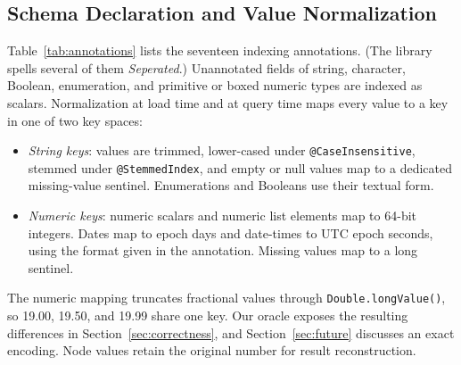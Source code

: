 \subsection{Schema Declaration and Value Normalization}
Table~\ref{tab:annotations} lists the seventeen indexing annotations. (The library spells several of them \emph{Seperated}.) Unannotated fields of string, character, Boolean, enumeration, and primitive or boxed numeric types are indexed as scalars. Normalization at load time and at query time maps every value to a key in one of two key spaces:
\begin{itemize}
\item \emph{String keys}: values are trimmed, lower-cased under \texttt{@CaseInsensitive}, stemmed under \texttt{@StemmedIndex}, and empty or null values map to a dedicated missing-value sentinel. Enumerations and Booleans use their textual form.
\item \emph{Numeric keys}: numeric scalars and numeric list elements map to 64-bit integers. Dates map to epoch days and date-times to UTC epoch seconds, using the format given in the annotation. Missing values map to a long sentinel.
\end{itemize}
The numeric mapping truncates fractional values through \texttt{Double.longValue()}, so 19.00, 19.50, and 19.99 share one key. Our oracle exposes the resulting differences in Section~\ref{sec:correctness}, and Section~\ref{sec:future} discusses an exact encoding. Node values retain the original number for result reconstruction.

